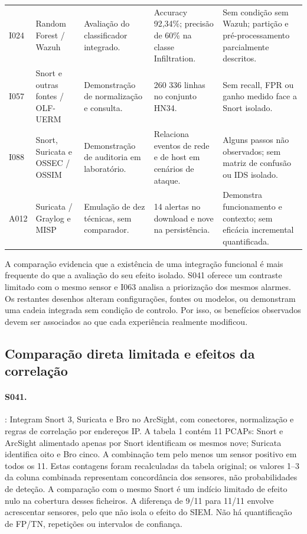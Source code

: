 \documentclass[11pt,a4paper]{article}
\begin{document}
\begin{longtable}{@{}P{1.15cm}P{2.65cm}P{3.0cm}P{3.5cm}P{4.85cm}@{}}
I024\newline\citep{predictive2026} & Random Forest / Wazuh & Avaliação do classificador integrado. & Accuracy 92,34\%; precisão de 60\% na classe Infiltration. & Sem condição sem Wazuh; partição e pré-processamento parcialmente descritos.\\[5pt]
I057\newline\citep{normalisation2014} & Snort e outras fontes / OLF-UERM & Demonstração de normalização e consulta. & 260 336 linhas no conjunto HN34. & Sem recall, FPR ou ganho medido face a Snort isolado.\\[5pt]
I088\newline\citep{ossimaudit2015} & Snort, Suricata e OSSEC / OSSIM & Demonstração de auditoria em laboratório. & Relaciona eventos de rede e de host em cenários de ataque. & Alguns passos não observados; sem matriz de confusão ou IDS isolado.\\[5pt]
A012\newline\citep{ctismes2025} & Suricata / Graylog e MISP & Emulação de dez técnicas, sem comparador. & 14 alertas no download e nove na persistência. & Demonstra funcionamento e contexto; sem eficácia incremental quantificada.\\[5pt]
\end{longtable}
\endgroup

A comparação evidencia que a existência de uma integração funcional é mais frequente do que a avaliação do seu efeito isolado. S041 oferece um contraste limitado com o mesmo sensor e I063 analisa a priorização dos mesmos alarmes. Os restantes desenhos alteram configurações, fontes ou modelos, ou demonstram uma cadeia integrada sem condição de controlo. Por isso, os benefícios observados devem ser associados ao que cada experiência realmente modificou.

\subsection{Comparação direta limitada e efeitos da correlação}
\paragraph{S041.} \citet{negi2021}: Integram Snort 3, Suricata e Bro no ArcSight, com conectores, normalização e regras de correlação por endereços IP. A tabela 1 contém 11 PCAPs: Snort e ArcSight alimentado apenas por Snort identificam os mesmos nove; Suricata identifica oito e Bro cinco. A combinação tem pelo menos um sensor positivo em todos os 11. Estas contagens foram recalculadas da tabela original; os valores 1--3 da coluna combinada representam concordância dos sensores, não probabilidades de deteção. A comparação com o mesmo Snort é um indício limitado de efeito nulo na cobertura desses ficheiros. A diferença de 9/11 para 11/11 envolve acrescentar sensores, pelo que não isola o efeito do SIEM. Não há quantificação de FP/TN, repetições ou intervalos de confiança.
\end{document}
